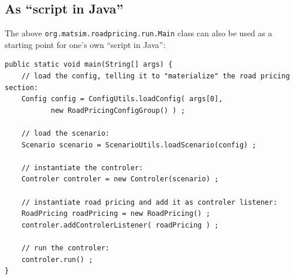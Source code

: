 \subsection{As ``script in Java''}

The above \lstinline$org.matsim.roadpricing.run.Main$ class can also be used as a starting point for one's own ``script in Java'':
\begin{lstlisting}
public static void main(String[] args) {
	// load the config, telling it to "materialize" the road pricing section:
	Config config = ConfigUtils.loadConfig( args[0], 
           new RoadPricingConfigGroup() ) ;
	
	// load the scenario:
	Scenario scenario = ScenarioUtils.loadScenario(config) ;

	// instantiate the controler:
	Controler controler = new Controler(scenario) ;

	// instantiate road pricing and add it as controler listener:
	RoadPricing roadPricing = new RoadPricing() ;
	controler.addControlerListener( roadPricing ) ;

	// run the controler:
	controler.run() ;
}
\end{lstlisting}




